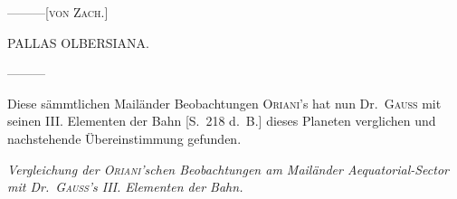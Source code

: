 \par\noindent\hspace*{\parindent}—\quad —\quad —\hfill[\textsc{von Zach.}]\par

\bigskip{}
\begin{center}
PALLAS OLBERSIANA.
\end{center}
\noindent\hspace*{\parindent}—\quad —\quad —\par\nobreak
\indent Diese sämmtlichen Mailänder Beobachtungen \textsc{Oriani}'s hat nun Dr.\ \textsc{Gauss} mit seinen III. Elementen der Bahn [S.\ 218 d.\ B.] dieses Planeten verglichen und nachstehende Übereinstimmung gefunden.
\begin{center}\textit{Vergleichung der \textsc{Oriani}'schen Beobachtungen am Mailänder Aequatorial-Sector mit Dr.\ \textsc{Gauss}'s III. Elementen der Bahn.}\end{center}
